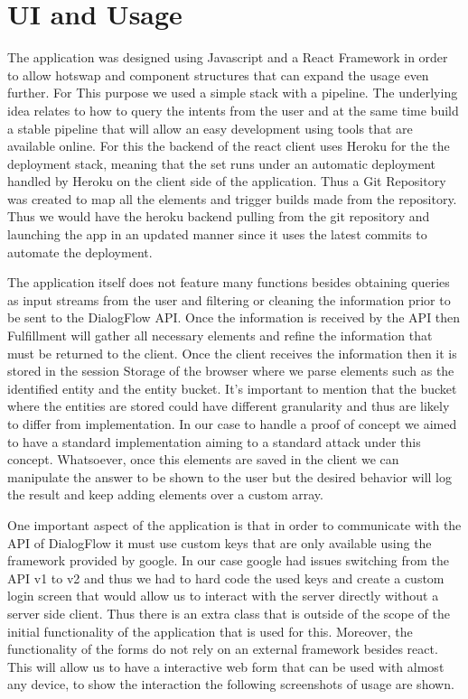 \section{UI and Usage}
The application was designed using Javascript and a React Framework in order to allow hotswap and component structures that can expand the usage even further. For This purpose we used a simple stack with a pipeline. The underlying idea relates to how to query the intents from the user and at the same time build a stable pipeline that will allow an easy development using tools that are available online. For this the backend of the react client uses Heroku for the the deployment stack, meaning that the set runs under an automatic deployment handled by Heroku on the client side of the application. Thus a Git Repository was created to map all the elements and trigger builds made from the repository. Thus we would have the heroku backend pulling from the git repository and launching the app in an updated manner since it uses the latest commits to automate the deployment.

The application itself does not feature many functions besides obtaining queries as input streams from the user and filtering or cleaning the information prior to be sent to the DialogFlow API. Once the information is received by the API then Fulfillment will gather all necessary elements and refine the information that must be returned to the client. Once the client receives the information then it is stored in the session Storage of the browser where we parse elements such as the identified entity and the entity bucket. It's important to mention that the bucket where the entities are stored could have different granularity and thus are likely 
to differ from implementation. In our case to handle a proof of concept we aimed to have a standard implementation aiming to a standard attack under this concept. Whatsoever, once this elements are saved in the client we can manipulate the answer to be shown to the user but the desired behavior will log the result and keep adding elements over a custom array. 

One important aspect of the application is that in order to communicate with the API of DialogFlow it must use custom keys that are only available using the framework provided by google. In our case google had issues switching from the API v1 to v2 and thus we had to hard code the used keys and create a custom login screen that would allow us to interact with the server directly without a server side client. Thus there is an extra class that is outside of the scope of the initial functionality of the application that is used for this. Moreover, the functionality of the forms do not rely on an external framework besides react. This will allow us to have a interactive web form that can be used with almost any device, to show the interaction the following screenshots of usage are shown.


